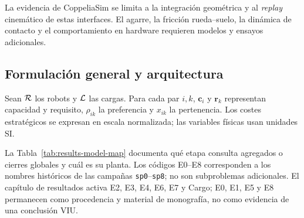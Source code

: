La evidencia de CoppeliaSim se limita a la integración geométrica y al
\emph{replay} cinemático de estas interfaces. El agarre, la fricción
rueda--suelo, la dinámica de contacto y el comportamiento en hardware requieren
modelos y ensayos adicionales.

\subsection{Formulación general y arquitectura}
\label{subsec:common-formulation}

Sean \(\mathcal{R}\) los robots y \(\mathcal{L}\) las cargas. Para cada par \(i,k\), \(\boldsymbol c_i\) y \(\boldsymbol r_k\) representan capacidad y requisito, \(\rho_{ik}\) la preferencia y \(x_{ik}\) la pertenencia. Los costes estratégicos se expresan en escala normalizada; las variables físicas usan unidades SI.

La Tabla~\ref{tab:results-model-map} documenta qué etapa consulta agregados o cierres globales y cuál es su planta. Los códigos E0--E8 corresponden a los nombres históricos de las campañas \texttt{sp0}--\texttt{sp8}; no son subproblemas adicionales. El capítulo de resultados activa E2, E3, E4, E6, E7 y Cargo; E0, E1, E5 y E8 permanecen como procedencia y material de monografía, no como evidencia de una conclusión VIU.

